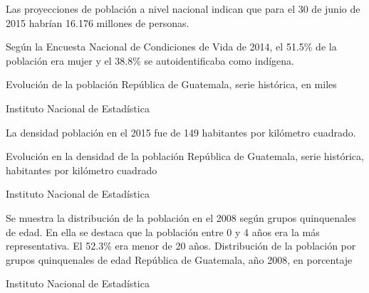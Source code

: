 


{%
Las proyecciones de población a nivel nacional indican que para el 30 de junio de 2015 habrían 16.176 millones de personas.

Según la Encuesta Nacional de Condiciones de Vida de 2014, el 51.5\% de la población era mujer y el 38.8\% se autoidentificaba como indígena. }%
{%
 Evolución de la población} %
{%
 República de Guatemala, serie histórica, en miles} %
{%
 \begin{tikzpicture}[x=1pt,y=1pt]    \end{tikzpicture}}%
{%
 Instituto Nacional de Estadística} %





 {%
La densidad población en el 2015 fue de 149 habitantes por kilómetro cuadrado.

}%
 {%
 Evolución en la densidad de la población} %
 {%
 	República de Guatemala, serie histórica, habitantes por kilómetro cuadrado} %
 {%
 	\begin{tikzpicture}[x=1pt,y=1pt]    \end{tikzpicture}}%
 {%
 	Instituto Nacional de Estadística} %
 
 
 
 
 

 {%
 Se muestra la distribución de la población en el 2008 según grupos quinquenales de edad. En ella se destaca que la población entre 0 y 4 años era la más representativa. El 52.3\% era menor de 20 años.
   }%
 {%
 	Distribución de la población por grupos quinquenales de edad} %
 {%
 	República de Guatemala, año 2008, en porcentaje} %
 {%
 	\begin{tikzpicture}[x=1pt,y=1pt]    \end{tikzpicture}}%
 {%
 	Instituto Nacional de Estadística} %
 

